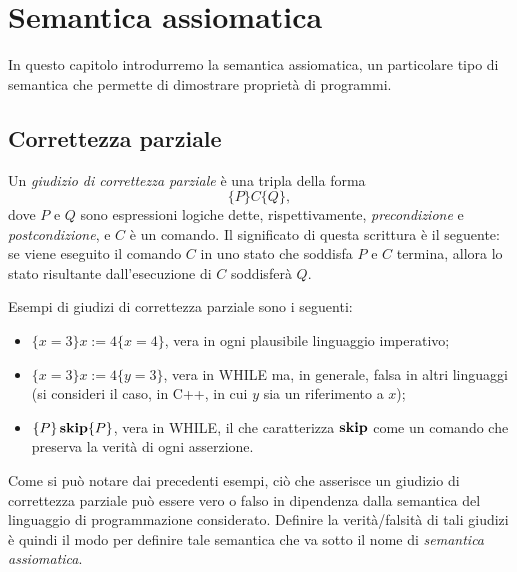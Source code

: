 \chapter{Semantica assiomatica}

In questo capitolo introdurremo la semantica assiomatica, un particolare
tipo di semantica che permette di dimostrare proprietà di programmi.

\section{Correttezza parziale}
\begin{definizione}
Un \emph{giudizio di correttezza parziale} è una tripla
della forma
\[
  \{P\} C \{Q\},
\]
dove $P$ e $Q$ sono espressioni logiche dette,
rispettivamente, \emph{precondizione} e \emph{postcondizione},
e $C$ è un comando. Il significato di questa scrittura è
il seguente: se viene eseguito il comando $C$ in uno stato che
soddisfa $P$ e $C$ termina, allora lo stato risultante dall'esecuzione di $C$
soddisferà $Q$.
\end{definizione}

Esempi di giudizi di correttezza parziale sono i seguenti:
\begin{itemize}
\item
$\{ x = 3 \} x := 4 \{ x = 4 \}$, vera in ogni plausibile linguaggio imperativo;
\item
$\{ x = 3 \} x := 4 \{ y = 3 \}$, vera in WHILE ma, in generale,
falsa in altri linguaggi (si consideri il caso, in C++, in cui $y$ sia
un riferimento a $x$);
\item
$\{ P \} \mathop{\textup{\textbf{skip}}} \{ P \}$, vera in WHILE, il che caratterizza
$\mathop{\textup{\textbf{skip}}}$ come un comando che preserva la verità di ogni asserzione.
\end{itemize}

Come si può notare dai precedenti esempi, ciò che asserisce un
giudizio di correttezza parziale può essere vero o falso
in dipendenza dalla semantica del linguaggio di programmazione
considerato.
Definire la verità/falsità di tali giudizi è quindi il modo
per definire tale semantica che va sotto il nome di
\emph{semantica assiomatica}.

